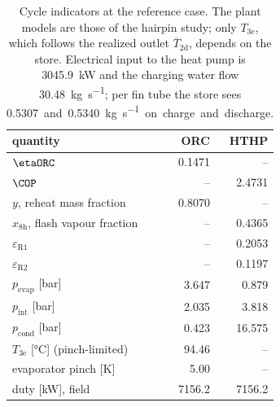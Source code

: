 \begin{table}[htbp]
\centering
\caption{Cycle indicators at the reference case. The plant models are those of the hairpin study; only $T_\mathrm{3e}$, which follows the realized outlet $\overline{T}_\mathrm{2d}$, depends on the store. Electrical input to the heat pump is \SI{3045.9}{\kilo\watt} and the charging water flow \SI{30.48}{\kilogram\per\second}; per fin tube the store sees \SI{0.5307} and \SI{0.5340}{\kilogram\per\second} on charge and discharge.}
\label{tab:cycles}
\small
\begin{tabular}{@{}l r r@{}}
\toprule
quantity & ORC & HTHP \\
\midrule
$\etaORC$ & 0.1471 & -- \\
$\COP$ & -- & 2.4731 \\
$y$, reheat mass fraction & 0.8070 & -- \\
$x_\mathrm{8h}$, flash vapour fraction & -- & 0.4365 \\
$\varepsilon_\mathrm{R1}$ & -- & 0.2053 \\
$\varepsilon_\mathrm{R2}$ & -- & 0.1197 \\
$p_\mathrm{evap}$ [\si{\bar}] & 3.647 & 0.879 \\
$p_\mathrm{int}$ [\si{\bar}] & 2.035 & 3.818 \\
$p_\mathrm{cond}$ [\si{\bar}] & 0.423 & 16.575 \\
$T_\mathrm{3e}$ [\si{\celsius}] (pinch-limited) & 94.46 & -- \\
evaporator pinch [\si{\kelvin}] & 5.00 & -- \\
duty [\si{\kilo\watt}], field & 7156.2 & 7156.2 \\
\bottomrule
\end{tabular}
\end{table}
